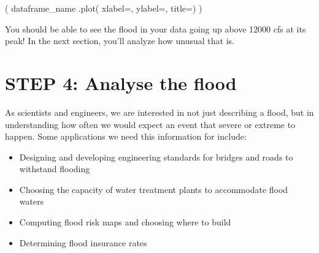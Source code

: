 \documentclass[
  letterpaper,
  DIV=11,
  numbers=noendperiod,
  oneside]{scrreprt}
\newenvironment{Shaded}{\begin{snugshade}}{\end{snugshade}}
\newcommand{\NormalTok}[1]{\textcolor[rgb]{0.00,0.23,0.31}{#1}}
\newcommand{\OperatorTok}[1]{\textcolor[rgb]{0.37,0.37,0.37}{#1}}
\newcommand{\StringTok}[1]{\textcolor[rgb]{0.13,0.47,0.30}{#1}}
\providecommand{\tightlist}{%
  \setlength{\itemsep}{0pt}\setlength{\parskip}{0pt}}
\begin{document}
\begin{tcolorbox}[enhanced jigsaw, colbacktitle=quarto-callout-color!10!white, opacityback=0, bottomtitle=1mm, toptitle=1mm, bottomrule=.15mm, left=2mm, colframe=quarto-callout-color-frame, leftrule=.75mm, opacitybacktitle=0.6, colback=white, rightrule=.15mm, toprule=.15mm, breakable, titlerule=0mm, title=\textcolor{quarto-callout-color}{\faInfo}\hspace{0.5em}{Try It}, coltitle=black, arc=.35mm]

\end{tcolorbox}

\begin{Shaded}
\begin{Highlighting}[]
\NormalTok{(}
\NormalTok{    dataframe\_name}
\NormalTok{    .plot(}
\NormalTok{        xlabel}\OperatorTok{=}\StringTok{\textquotesingle{}\textquotesingle{}}\NormalTok{, }
\NormalTok{        ylabel}\OperatorTok{=}\StringTok{\textquotesingle{}\textquotesingle{}}\NormalTok{,}
\NormalTok{        title}\OperatorTok{=}\StringTok{\textquotesingle{}\textquotesingle{}}\NormalTok{)}
\NormalTok{)}
\end{Highlighting}
\end{Shaded}

You should be able to see the flood in your data going up above 12000
cfs at its peak! In the next section, you'll analyze how unusual that
is.

\section{STEP 4: Analyse the flood}\label{step-4-analyse-the-flood}

As scientists and engineers, we are interested in not just describing a
flood, but in understanding how often we would expect an event that
severe or extreme to happen. Some applications we need this information
for include:

\begin{itemize}
\tightlist
\item
  Designing and developing engineering standards for bridges and roads
  to withstand flooding
\item
  Choosing the capacity of water treatment plants to accommodate flood
  waters
\item
  Computing flood risk maps and choosing where to build
\item
  Determining flood insurance rates
\end{itemize}
\end{document}
